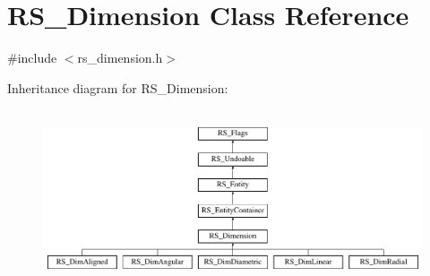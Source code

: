 \hypertarget{classRS__Dimension}{\section{R\-S\-\_\-\-Dimension Class Reference}
\label{classRS__Dimension}
}


{\ttfamily \#include $<$rs\-\_\-dimension.\-h$>$}

Inheritance diagram for R\-S\-\_\-\-Dimension\-:\begin{figure}[H]
\begin{center}
\leavevmode
\includegraphics[height=5.209302cm]{classRS__Dimension}
\end{center}
\end{figure}

